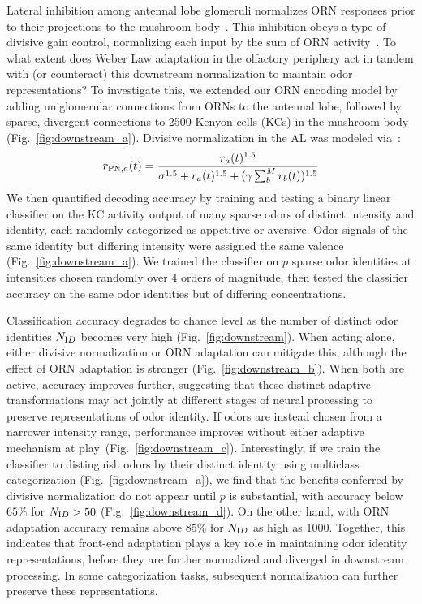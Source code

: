\documentclass[9pt,twocolumn,twoside,lineno]{pnas-new}
\begin{document}
Lateral inhibition among antennal lobe glomeruli normalizes ORN responses prior to their projections to the mushroom body~\cite{lateral_inh, lateral_inh_asahina}. This inhibition obeys a type of divisive gain control, normalizing each input by the sum of ORN activity~\cite{divisive_normalization}. To what extent does Weber Law adaptation in the olfactory periphery act in tandem with (or counteract) this downstream normalization to maintain odor representations? To investigate this, we extended our ORN encoding model by adding uniglomerular connections from ORNs to the antennal lobe, followed by sparse, divergent connections to 2500 Kenyon cells (KCs) in the mushroom body~\cite{memory_review, litwinkumar, abbott_axel} (Fig.~\ref{fig:downstream_a}). Divisive normalization in the AL was modeled via~\cite{divisive_normalization}:
\begin{align}
r_{\textup{PN}, a}(t) = \frac{r_a(t)^{1.5}}{\sigma^{1.5} + r_a(t)^{1.5} + (\gamma\sum_b^Mr_b(t))^{1.5}}
\end{align}
We then quantified decoding accuracy by training and testing a binary linear classifier on the KC activity output of  many sparse odors of distinct intensity and identity,  each randomly categorized as appetitive or aversive. Odor signals of the same identity but differing intensity were assigned the same valence (Fig.~\ref{fig:downstream_a}). We trained the classifier on $p$ sparse odor identities at intensities chosen randomly over 4 orders of magnitude, then tested the classifier accuracy on the same odor identities but of differing concentrations. 

Classification accuracy degrades to chance level as the number of distinct odor identities $N_{\text ID}$ becomes very high (Fig.~\ref{fig:downstream}). When acting alone, either divisive normalization or ORN adaptation can mitigate this, although the effect of ORN adaptation is stronger (Fig.~\ref{fig:downstream_b}). When both are active, accuracy improves further, suggesting that these distinct adaptive transformations may act jointly at different stages of neural processing to preserve representations of odor identity.  If odors are instead chosen from a narrower intensity range, performance improves without either adaptive mechanism at play~(Fig.~\ref{fig:downstream_c}). Interestingly, if we train the classifier to distinguish odors by their distinct identity using multiclass categorization (Fig.~\ref{fig:downstream_a}), we find that the benefits conferred by divisive normalization do not appear until $p$ is substantial, with accuracy below $65\%$ for $N_{\text ID} > 50$ (Fig.~\ref{fig:downstream_d}). On the other hand, with ORN adaptation accuracy remains above $85\%$ for $N_{\text ID}$ as high as 1000. Together, this indicates that front-end adaptation plays a key role in maintaining odor identity representations, before they are further normalized and diverged in downstream processing. In some categorization tasks, subsequent normalization can further preserve these representations.
\end{document}
